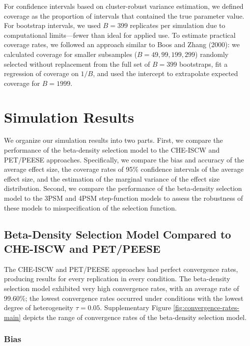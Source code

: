 \documentclass[
  american,
  man, donotrepeattitle,floatsintext]{apa7}
\begin{document}
For confidence intervals based on cluster-robust variance estimation, we defined coverage as the proportion of intervals that contained the true parameter value. For bootstrap intervals, we used \(B = 399\) replicates per simulation due to computational limits---fewer than ideal for applied use. To estimate practical coverage rates, we followed an approach similar to Boos and Zhang (2000): we calculated coverage for smaller subsamples (\(B = 49, 99, 199, 299\)) randomly selected without replacement from the full set of \(B = 399\) bootstraps, fit a regression of coverage on \(1/B\), and used the intercept to extrapolate expected coverage for \(B = 1999\).

\section{Simulation Results}\label{simulation-results}

We organize our simulation results into two parts. First, we compare the performance of the beta-density selection model to the CHE-ISCW and PET/PEESE approaches. Specifically, we compare the bias and accuracy of the average effect size, the coverage rates of 95\% confidence intervals of the average effect size, and the estimation of the marginal variance of the effect size distribution. Second, we compare the performance of the beta-density selection model to the 3PSM and 4PSM step-function models to assess the robustness of these models to misspecification of the selection function.

\subsection{Beta-Density Selection Model Compared to CHE-ISCW and PET/PEESE}\label{beta-density-selection-model-compared-to-che-iscw-and-petpeese}

The CHE-ISCW and PET/PEESE approaches had perfect convergence rates, producing results for every replication in every condition. The beta-density selection model exhibited very high convergence rates, with an average rate of 99.60\%; the lowest convergence rates occurred under conditions with the lowest degree of heterogeneity \(\tau = 0.05\). Supplementary Figure \ref{fig:convergence-rates-main} depicts the range of convergence rates of the beta-density selection model.

\subsubsection{Bias}\label{bias}
\end{document}
